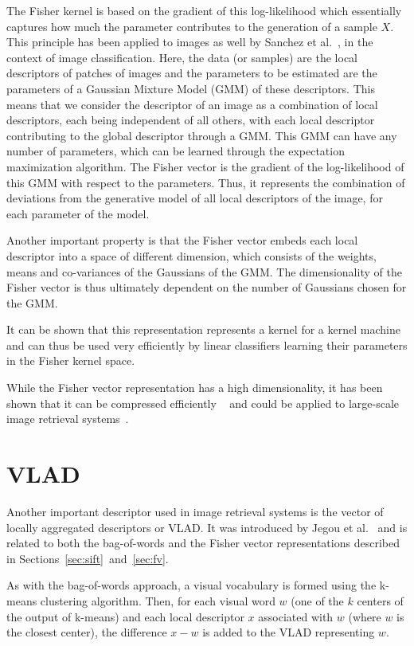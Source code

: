 The Fisher kernel is based on the gradient of this log-likelihood which
essentially captures how much the parameter contributes to the generation
of a sample $X$. This principle has been applied to images as well by
Sanchez et al.~\cite{sanchez_image_2013}, in the context of image
classification. Here, the data (or samples) are the local descriptors of
patches of images and the parameters to be estimated are the parameters
of a Gaussian Mixture Model (GMM) of these descriptors.
This means that we consider the descriptor of an image as a
combination of local descriptors, each being independent of all others,
with each local descriptor contributing to the global descriptor through
a GMM. This GMM can have any number
of parameters, which can be learned through the expectation maximization
algorithm. The Fisher vector is the gradient of the log-likelihood of this
GMM with respect to the parameters. Thus, it represents the combination
of deviations from the generative model of all local descriptors of the
image, for each parameter of the model.

Another important property is that the Fisher
vector embeds each local descriptor into a space of
different dimension, which consists of the weights, means and co-variances
of the Gaussians of the GMM. The dimensionality of the Fisher
vector is thus ultimately dependent on the number of Gaussians chosen for
the GMM.

It can be shown that this representation represents a kernel for a kernel
machine and can thus be used very efficiently by linear classifiers learning
their parameters in the Fisher kernel space.

While the Fisher vector representation has a high dimensionality, it
has been shown that it can be compressed efficiently
~\cite{sanchez_image_2013,perronnin_large-scale_2010} and could be applied
to large-scale image retrieval systems~\cite{perronnin_large-scale_2010}.

\section{VLAD}
Another important descriptor used in image retrieval systems is the
vector of locally aggregated descriptors or VLAD. It was introduced
by Jegou et al.~\cite{jegou_aggregating_2010} and is related to both
the bag-of-words and the Fisher vector representations described in
Sections~\ref{sec:sift}~and~\ref{sec:fv}.

As with the bag-of-words approach, a visual vocabulary is formed
using the k-means clustering algorithm. Then, for each visual
word $w$ (one of the $k$ centers of the output of k-means)
and each local descriptor $x$ associated with $w$ (where $w$ is the closest
center), the difference $x-w$ is added to the VLAD representing $w$.

